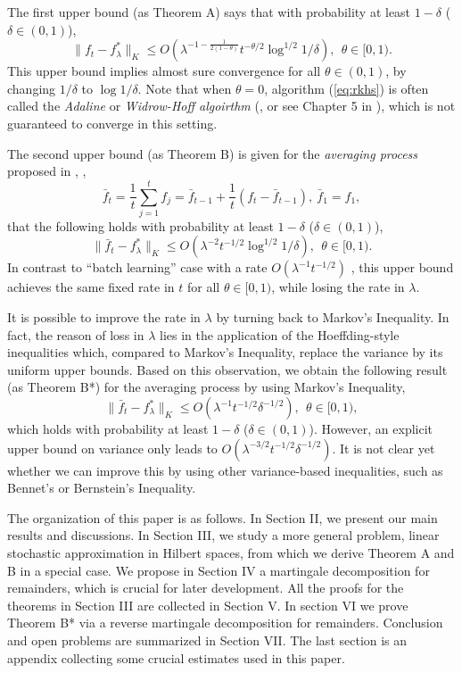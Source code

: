\documentclass[twoside,twocolumn,journal]{IEEEtran}
\begin{document}
The first upper bound (as Theorem A) says that with probability at least $1-\delta$ ($\delta\in (0,1)$),
\[ \|f_t-f^\ast_\lambda\|_K \leq O(\lambda^{-1 - \frac{1}{2(1-\theta)}} t^{-\theta/2}\log^{1/2} 1/\delta), \ \ \mbox{$\theta\in [0,1)$}. \]
This upper bound implies almost sure convergence for all $\theta\in (0,1)$, by changing $1/\delta$ to $\log 1/\delta$. Note that
when $\theta=0$, algorithm (\ref{eq:rkhs}) is often called the \emph{Adaline} or \emph{Widrow-Hoff algoirthm}
(\cite{WidHof60}, or see Chapter 5 in \cite{CriSha00}),
which is not guaranteed to converge in this setting.

The second upper bound (as Theorem B) is given for the \emph{averaging process} proposed in \cite{Polyak90}, \cite{Ruppert88},
\begin{equation} \label{eq:averaging}
 \bar{f}_t = \frac{1}{t} \sum_{j=1}^t f_j = \bar{f}_{t-1} + \frac{1}{t} (f_t - \bar{f}_{t-1}), \ \bar{f}_1=f_1,
\end{equation}
that the following holds with probability at least $1-\delta$ ($\delta\in (0,1)$),
\[ \|\bar{f}_t - f^\ast_\lambda\|_K \leq O(\lambda^{-2}t^{-1/2} \log^{1/2} 1/\delta), \ \ \mbox{$\theta \in [0,1)$}. \]
In contrast to ``batch learning'' case with a rate $O(\lambda^{-1} t^{-1/2})$ \cite{SmaZho-ShannonIII}, this upper bound achieves the same fixed rate
in $t$ for all $\theta\in [0,1)$, while losing the rate in $\lambda$.

It is possible to improve the rate in $\lambda$ by turning back to Markov's Inequality. In fact, the reason of loss in $\lambda$ lies in the application
of the Hoeffding-style inequalities which, compared to Markov's Inequality, replace the variance by its uniform upper bounds.
Based on this observation, we obtain the following result (as Theorem B*) for the averaging process by using Markov's Inequality,
\[ \|\bar{f}_t - f^\ast_\lambda\|_K \leq O(\lambda^{-1}t^{-1/2} \delta^{-1/2}), \ \ \mbox{$\theta \in [0,1)$}, \]
which holds with probability at least $1-\delta$ ($\delta\in (0,1)$). However, an explicit upper bound on variance only leads to
$O(\lambda^{-3/2}t^{-1/2} \delta^{-1/2})$. It is not clear yet whether we can improve this by using other variance-based inequalities, such as
Bennet's or Bernstein's Inequality.

The organization of this paper is as follows. In Section II, we present our main results and discussions. In Section III, we study
a more general problem, linear stochastic approximation in Hilbert spaces, from which we derive Theorem A and B in a special case.
We propose in Section IV a martingale decomposition for remainders, which is crucial for later development. All the proofs for the theorems in Section III
are collected in Section V. In section VI we prove Theorem B* via a reverse martingale decomposition for remainders. Conclusion and open problems
are summarized in Section VII. The last section is an appendix collecting some crucial estimates used in this paper.
\end{document}
